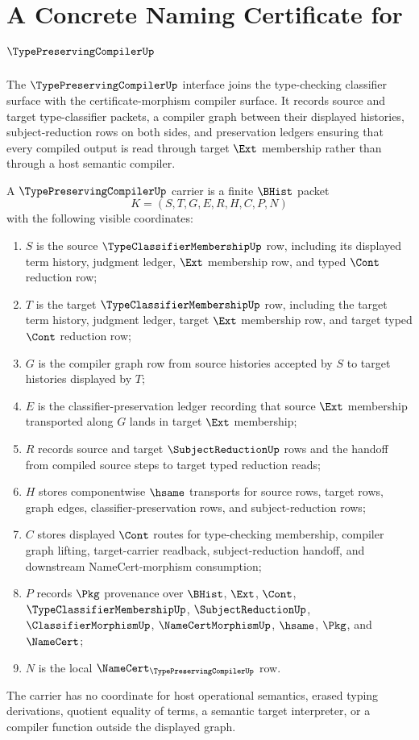 \chapter{A Concrete Naming Certificate for $\TypePreservingCompilerUp$}
\label{ch:concrete-instances-typepreservingcompiler-namecert}

The $\TypePreservingCompilerUp$ interface joins the type-checking classifier surface with the certificate-morphism compiler surface. It records source and target type-classifier packets, a compiler graph between their displayed histories, subject-reduction rows on both sides, and preservation ledgers ensuring that every compiled output is read through target $\Ext$ membership rather than through a host semantic compiler.

\begin{definition}
\label{def:type-preserving-compiler-carrier}
A $\TypePreservingCompilerUp$ carrier is a finite $\BHist$ packet
$$
K=(S,T,G,E,R,H,C,P,N)
$$
with the following visible coordinates:
\begin{enumerate}
\item $S$ is the source $\TypeClassifierMembershipUp$ row, including its displayed term history, judgment ledger, $\Ext$ membership row, and typed $\Cont$ reduction row;
\item $T$ is the target $\TypeClassifierMembershipUp$ row, including the target term history, judgment ledger, target $\Ext$ membership row, and target typed $\Cont$ reduction row;
\item $G$ is the compiler graph row from source histories accepted by $S$ to target histories displayed by $T$;
\item $E$ is the classifier-preservation ledger recording that source $\Ext$ membership transported along $G$ lands in target $\Ext$ membership;
\item $R$ records source and target $\SubjectReductionUp$ rows and the handoff from compiled source steps to target typed reduction reads;
\item $H$ stores componentwise $\hsame$ transports for source rows, target rows, graph edges, classifier-preservation rows, and subject-reduction rows;
\item $C$ stores displayed $\Cont$ routes for type-checking membership, compiler graph lifting, target-carrier readback, subject-reduction handoff, and downstream NameCert-morphism consumption;
\item $P$ records $\Pkg$ provenance over $\BHist$, $\Ext$, $\Cont$, $\TypeClassifierMembershipUp$, $\SubjectReductionUp$, $\ClassifierMorphismUp$, $\NameCertMorphismUp$, $\hsame$, $\Pkg$, and $\NameCert$;
\item $N$ is the local $\NameCert_{\TypePreservingCompilerUp}$ row.
\end{enumerate}
The carrier has no coordinate for host operational semantics, erased typing derivations, quotient equality of terms, a semantic target interpreter, or a compiler function outside the displayed graph.
\end{definition}

